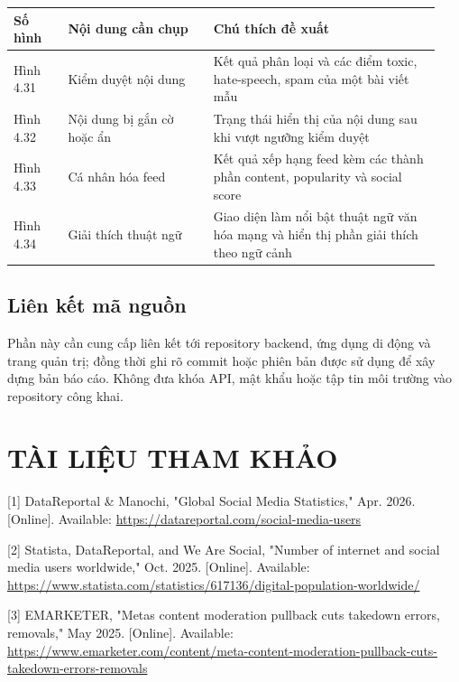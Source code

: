 {\def\LTcaptype{none}
\begin{longtable}{
  |>{\centering\arraybackslash}p{0.12\linewidth}
  |>{\raggedright\arraybackslash}p{0.32\linewidth}
  |>{\raggedright\arraybackslash}p{0.50\linewidth}|}
\hline
\textbf{Số hình} & \textbf{Nội dung cần chụp} & \textbf{Chú thích đề xuất} \\ \hline
\endhead
\hline
\endlastfoot
Hình 4.31 & Kiểm duyệt nội dung & Kết quả phân loại và các điểm toxic, hate-speech, spam của một bài viết mẫu \\ \hline
Hình 4.32 & Nội dung bị gắn cờ hoặc ẩn & Trạng thái hiển thị của nội dung sau khi vượt ngưỡng kiểm duyệt \\ \hline
Hình 4.33 & Cá nhân hóa feed & Kết quả xếp hạng feed kèm các thành phần content, popularity và social score \\ \hline
Hình 4.34 & Giải thích thuật ngữ & Giao diện làm nổi bật thuật ngữ văn hóa mạng và hiển thị phần giải thích theo ngữ cảnh \\ \hline
\end{longtable}
}

\section{Liên kết mã nguồn}

Phần này cần cung cấp liên kết tới repository backend, ứng dụng di động
và trang quản trị; đồng thời ghi rõ commit hoặc phiên bản được sử dụng
để xây dựng bản báo cáo. Không đưa khóa API, mật khẩu hoặc tập tin môi
trường vào repository công khai.

\chapter*{TÀI LIỆU THAM KHẢO}
\sloppy

{[}1{]} DataReportal \& Manochi, "Global Social Media Statistics," Apr.
2026. {[}Online{]}. Available:
\url{https://datareportal.com/social-media-users}

{[}2{]} Statista, DataReportal, and We Are Social, "Number of internet
and social media users worldwide," Oct. 2025. {[}Online{]}. Available:
\url{https://www.statista.com/statistics/617136/digital-population-worldwide/}

{[}3{]} EMARKETER, "Meta\textquotesingle s content moderation pullback
cuts takedown errors, removals," May 2025. {[}Online{]}. Available:
\url{https://www.emarketer.com/content/meta-content-moderation-pullback-cuts-takedown-errors-removals}

